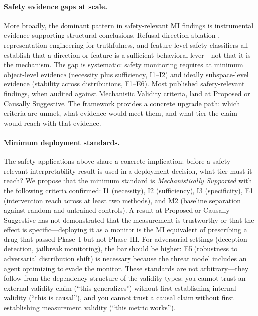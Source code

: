 \documentclass{article}
\begin{document}
\paragraph{Safety evidence gaps at scale.}
More broadly, the dominant pattern in safety-relevant MI findings is instrumental evidence supporting structural conclusions.  Refusal direction ablation \citep{turner2024activation}, representation engineering for truthfulness, and feature-level safety classifiers all establish that a direction or feature is a sufficient behavioral lever---not that it is the mechanism.  The gap is systematic: safety monitoring requires at minimum object-level evidence (necessity plus sufficiency, I1--I2) and ideally subspace-level evidence (stability across distributions, E1--E6).  Most published safety-relevant findings, when audited against Mechanistic Validity criteria, land at Proposed or Causally Suggestive.  The framework provides a concrete upgrade path: which criteria are unmet, what evidence would meet them, and what tier the claim would reach with that evidence.

\paragraph{Minimum deployment standards.}
The safety applications above share a concrete implication: before a safety-relevant interpretability result is used in a deployment decision, what tier must it reach? We propose that the minimum standard is \emph{Mechanistically Supported} with the following criteria confirmed: I1 (necessity), I2 (sufficiency), I3 (specificity), E1 (intervention reach across at least two methods), and M2 (baseline separation against random and untrained controls). A result at Proposed or Causally Suggestive has not demonstrated that the measurement is trustworthy or that the effect is specific---deploying it as a monitor is the MI equivalent of prescribing a drug that passed Phase~I but not Phase~III. For adversarial settings (deception detection, jailbreak monitoring), the bar should be higher: E5 (robustness to adversarial distribution shift) is necessary because the threat model includes an agent optimizing to evade the monitor. These standards are not arbitrary---they follow from the dependency structure of the validity types: you cannot trust an external validity claim (``this generalizes'') without first establishing internal validity (``this is causal''), and you cannot trust a causal claim without first establishing measurement validity (``this metric works'').
\end{document}
